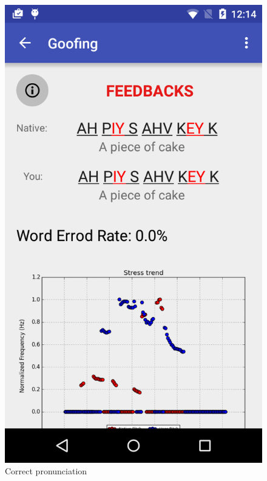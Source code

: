 \begin{figure}[!ht]
	\centering
	\begin{minipage}{.5\textwidth}
		\centering
		\includegraphics[scale=0.18]{Figures/screenshots/error_rate1.png}
		\caption{Correct pronunciation}
		\label{fig:error_rate_page}
	\end{minipage}%
	\begin{minipage}{.5\textwidth}
		\centering

\end{minipage}
\end{figure}
